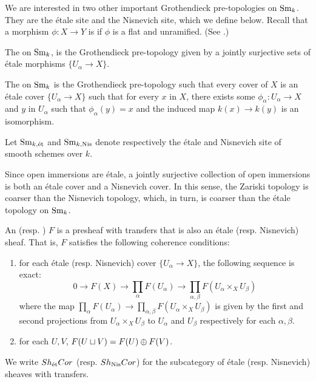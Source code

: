We are interested in two other important Grothendieck 
pre-topologies on $\mathrm{Sm}_{k}$. They are the \'etale site and the 
Nisnevich site, which we define below. Recall that a morphism 
$\phi: X \to Y$ is  if $\phi$ is a flat and 
unramified. (See \cite[\S 1.3]{Milne}.)

\begin{defn}\label{def_sites}
  The  on $\mathrm{Sm}_{k}$, is the Grothendieck
  pre-topology given by a jointly surjective sets of \'etale morphisms
  $\{U_\alpha \to X\}.$

  The  on $\mathrm{Sm}_{k}$ is the Grothendieck
  pre-topology such that every cover of $X$ is an \'etale cover
  $\{U_\alpha \to X\}$ such that for every $x$ in $X$, there exists
  some $\phi_\alpha: U_\alpha \to X$ and $y$ in $U_\alpha$ such that
  $\phi_\alpha(y) = x$ and the induced map $k(x) \to k(y)$ is an
  isomorphism.

  Let $\mathrm{Sm}_{k,\mathrm{\acute{e}t}}$ and $\mathrm{Sm}_{k, \mathrm{Nis}}$ denote respectively the \'etale and
  Nisnevich site of smooth schemes over $k$.
\end{defn}

Since open immersions are \'etale, a jointly surjective collection 
of open immersions is both an \'etale cover and a Nisnevich cover. 
In this sense, the Zariski topology is coarser than the Nisnevich 
topology, which, in turn, is coarser than the \'etale topology
on $\mathrm{Sm}_{k}$.

\begin{defn}\label{def_etale_sheaf}\label{def_nis_sheaf}
An  (resp. ) $F$ is a presheaf with transfers that is also
an \'etale (resp. Nisnevich) sheaf. That is, $F$ satisfies the
following coherence conditions:
\begin{enumerate}
\item for each \'etale (resp. Nisnevich) cover $\{U_\alpha \to 
X\}$, the following sequence is exact:
\[
0 \to F(X) \to \prod_\alpha F(U_\alpha) \to \prod_{\alpha, \beta} 
   F(U_\alpha \times_X U_\beta)
\]
where the map $\prod_\alpha F(U_\alpha) \to \prod_{\alpha, \beta} 
F(U_\alpha \times_X U_\beta)$ is given by the first and second 
projections from $U_\alpha \times_X U_\beta$ to $U_\alpha$ and
$U_\beta$ respectively for each $\alpha, \beta$.

\item for each $U, V$, $F(U \sqcup V) = F(U) \oplus F(V)$.
\end{enumerate}

\noindent We write $Sh_{\mathrm{\acute{e}t}}Cor$ (resp. $Sh_{\mathrm{Nis}}Cor$) for the 
subcategory of \'etale (resp. Nisnevich) sheaves with transfers.
\end{defn}

